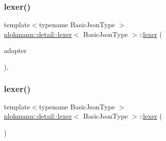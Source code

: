 \subsubsection{\texorpdfstring{lexer()}{lexer()}\hspace{0.1cm}{\footnotesize\ttfamily [1/3]}}
{\footnotesize\ttfamily template$<$typename Basic\+Json\+Type $>$ \\
\hyperlink{classnlohmann_1_1detail_1_1lexer}{nlohmann\+::detail\+::lexer}$<$ Basic\+Json\+Type $>$\+::\hyperlink{classnlohmann_1_1detail_1_1lexer}{lexer} (\begin{DoxyParamCaption}\item[{\hyperlink{namespacenlohmann_1_1detail_ae132f8cd5bb24c5e9b40ad0eafedf1c2}{detail\+::input\+\_\+adapter\+\_\+t} \&\&}]{adapter }\end{DoxyParamCaption})\hspace{0.3cm}{\ttfamily [inline]}, {\ttfamily [explicit]}}

\mbox{\label{classnlohmann_1_1detail_1_1lexer_a2e8ce2a0d266d148b69dfbcc2e4ad71a}} 
\subsubsection{\texorpdfstring{lexer()}{lexer()}\hspace{0.1cm}{\footnotesize\ttfamily [2/3]}}
{\footnotesize\ttfamily template$<$typename Basic\+Json\+Type $>$ \\
\hyperlink{classnlohmann_1_1detail_1_1lexer}{nlohmann\+::detail\+::lexer}$<$ Basic\+Json\+Type $>$\+::\hyperlink{classnlohmann_1_1detail_1_1lexer}{lexer} (\begin{DoxyParamCaption}\item[{const \hyperlink{classnlohmann_1_1detail_1_1lexer}{lexer}$<$ Basic\+Json\+Type $>$ \&}]{ }\end{DoxyParamCaption})\hspace{0.3cm}{\ttfamily [delete]}}

\mbox{\label{classnlohmann_1_1detail_1_1lexer_a9045348915010649fad1f15e80b6e34d}} 
